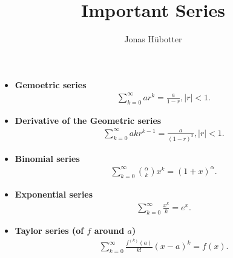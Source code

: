 \documentclass{article}
\title{Important Series}
\author{Jonas Hübotter}
\begin{document}
\maketitle

\begin{itemize}
    \item \textbf{Gemoetric series}
        \begin{align*}
            &\sum_{k=0}^\infty a r^k = \frac{a}{1-r}, |r| < 1.
        \end{align*}
    \item \textbf{Derivative of the Geometric series}
        \begin{align*}
            &\sum_{k=0}^\infty a k r^{k-1} = \frac{a}{(1-r)^2}, |r| < 1.
        \end{align*}
    \item \textbf{Binomial series}
        \begin{align*}
            &\sum_{k=0}^\infty {\alpha \choose k} x^k = (1+x)^\alpha.
        \end{align*}
    \item \textbf{Exponential series}
        \begin{align*}
            &\sum_{k=0}^\infty \frac{x^k}{k} = e^x.
        \end{align*}
    \item \textbf{Taylor series (of $f$ around $a$)}
        \begin{align*}
            &\sum_{k=0}^\infty \frac{f^{(k)}(a)}{k!} (x-a)^k = f(x).
        \end{align*}
\end{itemize}
\end{document}
